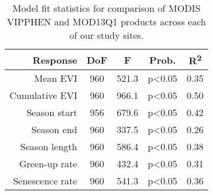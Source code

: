 \begin{table}[h]
\centering
\begin{tabular}{rcccc}
  \hline
Response & DoF & F & Prob. & R\textsuperscript{2} \\ 
  \hline
Mean EVI & 960 & 521.3 & p<0.05 & 0.35 \\ 
  Cumulative EVI & 960 & 966.1 & p<0.05 & 0.50 \\ 
  Season start & 956 & 679.6 & p<0.05 & 0.42 \\ 
  Season end & 960 & 337.5 & p<0.05 & 0.26 \\ 
  Season length & 960 & 586.4 & p<0.05 & 0.38 \\ 
  Green-up rate & 960 & 432.4 & p<0.05 & 0.31 \\ 
  Senescence rate & 960 & 541.3 & p<0.05 & 0.36 \\ 
   \hline
\end{tabular}
\caption{Model fit statistics for comparison of MODIS VIPPHEN and MOD13Q1 products across each of our study sites.} 
\label{annot_df}
\end{table}

